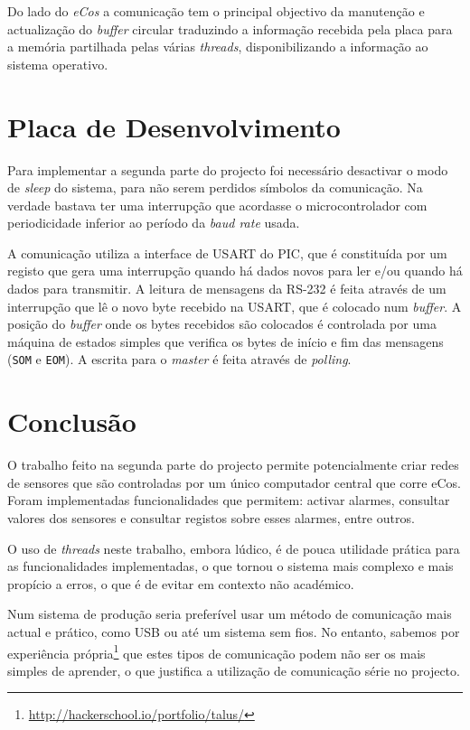 \documentclass[a4paper]{article}
\begin{document}
    Do lado do \textit{eCos} a comunicação tem o principal objectivo da manutenção e actualização do \textit{buffer} circular traduzindo a informação recebida pela placa para a memória partilhada pelas várias \textit{threads}, disponibilizando a informação ao sistema operativo.
    
    
    
    \section{Placa de Desenvolvimento}

	Para implementar a segunda parte do projecto foi necessário desactivar o modo de \textit{sleep} do sistema, para não serem perdidos símbolos da comunicação. Na verdade bastava ter uma interrupção que acordasse o microcontrolador com periodicidade inferior ao período da \textit{baud rate} usada.
    
    A comunicação utiliza a interface de USART do PIC, que é constituída por um registo que gera uma interrupção quando há dados novos para ler e/ou quando há dados para transmitir. A leitura de mensagens da RS-232 é feita através de um interrupção que lê o novo byte recebido na USART, que é colocado num \textit{buffer}. A posição do \textit{buffer} onde os bytes recebidos são colocados é controlada por uma máquina de estados simples que verifica os bytes de início e fim das mensagens (\texttt{SOM} e \texttt{EOM}). A escrita para o \textit{master} é feita através de \textit{polling}.
    
    
    

	\section{Conclusão}

    O trabalho feito na segunda parte do projecto permite potencialmente criar redes de sensores que são controladas por um único computador central que corre eCos. Foram implementadas funcionalidades que permitem: activar alarmes, consultar valores dos sensores e consultar registos sobre esses alarmes, entre outros.
    
    O uso de \textit{threads} neste trabalho, embora lúdico, é de pouca utilidade prática para as funcionalidades implementadas, o que tornou o sistema mais complexo e mais propício a erros, o que é de evitar em contexto não académico.
    
    Num sistema de produção seria preferível usar um método de comunicação mais actual e prático, como USB ou até um sistema sem fios. No entanto, sabemos por experiência própria\footnote{\url{http://hackerschool.io/portfolio/talus/}}  que estes tipos de comunicação podem não ser os mais simples de aprender, o que justifica a utilização de comunicação série no projecto.
    
\end{document}
